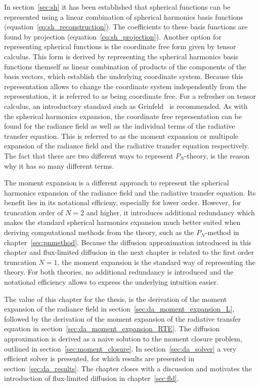In section~\ref{sec:sh} it has been established that spherical functions can be represented using a linear combination of spherical harmonics basis functions (equation~\ref{eq:sh_reconstruction}). The coefficients to these basis functions are found by projection (equation~\ref{eq:sh_projection}). Another option for representing spherical functions is the coordinate free form given by tensor calculus. This form is derived by representing the spherical harmonics basis functions themself as linear combination of products of the components of the basis vectors, which establish the underlying coordinate system. Because this representation allows to change the coordinate system independently from the representation, it is referred to as being coordinate free. For a refresher on tensor calculus, an introductory standard such as Grinfeld~\cite{Grinfeld13} is recommended. As with the spherical harmonics expansion, the coordinate free representation can be found for the radiance field as well as the individual terms of the radiative transfer equation. This is referred to as the moment expansion or multipole expansion of the radiance field and the radiative transfer equation respectively. The fact that there are two different ways to represent $P_N$-theory, is the reason why it has so many different terms.

The moment expansion is a different approach to represent the spherical harmonics expansion of the radiance field and the radiative transfer equation. Its benefit lies in its notational efficieny, especially for lower order. However, for truncation order of $N=2$ and higher, it introduces additional redundancy which makes the standard spherical harmonics expansion much better suited when deriving computational methods from the theory, such as the $P_N$-method in chapter~\ref{sec:pnmethod}. Because the diffusion approximation introduced in this chapter and flux-limited diffusion in the next chapter is related to the first order truncation $N=1$, the moment expansion is the standard way of representing the theory. For both theories, no additional redundancy is introduced and the notational efficiency allows to express the underlying intuition easier.

The value of this chapter for the thesis, is the derivation of the moment expansion of the radiance field in section~\ref{sec:da_moment_expansion_L}, followed by the derivation of the moment expansion of the radiative transfer equation in section~\ref{sec:da_moment_expansion_RTE}. The diffusion approximation is derived as a naive solution to the moment closure problem, outlined in section~\ref{sec:moment_closure}. In section~\ref{sec:da_solver} a very efficient solver is presented, for which results are presented in section~\ref{sec:da_results}. The chapter closes with a discussion and motivates the introduction of flux-limited diffusion in chapter~\ref{sec:fld}.










